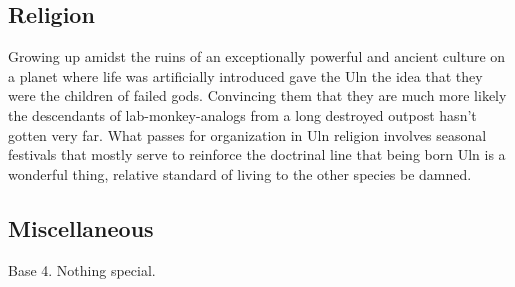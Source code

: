\subsection{Religion}
Growing up amidst the ruins of an exceptionally powerful and ancient
culture on a planet where life was artificially introduced gave the
Uln the idea that they were the children of failed gods. Convincing
them that they are much more likely the descendants of
lab-monkey-analogs from a long destroyed outpost hasn't gotten very
far. What passes for organization in Uln religion involves seasonal
festivals that mostly serve to reinforce the doctrinal line that being
born Uln is a wonderful thing, relative standard of living to the
other species be damned.

\subsection{Miscellaneous}
Base 4. Nothing special. 
